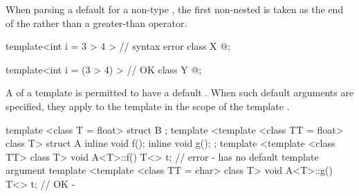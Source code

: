 %
\pnum
When parsing a
default
for a non-type
,
the first non-nested
\tcode{>}
is taken as the end of the
rather than a greater-than operator.
\begin{example}

\begin{codeblock}
template<int i = 3 > 4 >        // syntax error
class X { @\commentellip@ };

template<int i = (3 > 4) >      // OK
class Y { @\commentellip@ };
\end{codeblock}
\end{example}

\pnum
A
of a template
is permitted to have a default
.
When such default arguments are specified, they apply to the template
in the scope of the template
.
\begin{example}
\begin{codeblock}
template <class T = float> struct B {};
template <template <class TT = float> class T> struct A {
  inline void f();
  inline void g();
};
template <template <class TT> class T> void A<T>::f() {
  T<> t;            // error -  has no default template argument
}
template <template <class TT = char> class T> void A<T>::g() {
    T<> t;          // OK - 
}
\end{codeblock}
\end{example}

